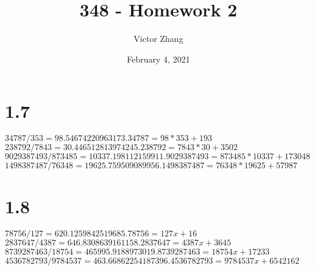 \documentclass{article}
\title{348 - Homework 2}
\author{Victor Zhang}
\date{February 4, 2021}
\begin{document}
\maketitle

\section*{1.7}
$34787/353 = 98.54674220963173. 34787 = 98*353 + 193$\\
$238792/7843 = 30.446512813974245. 238792 = 7843*30 + 3502$\\
$9029387493/873485 = 10337.198112159911. 9029387493 = 873485*10337 + 173048$\\
$1498387487/76348 = 19625.759509089956. 1498387487 = 76348*19625 + 57987$\\

\section*{1.8}
$78756/127 = 620.1259842519685. 78756 = 127x + 16$\\
$2837647/4387 = 646.8308639161158. 2837647 = 4387x + 3645$\\
$8739287463/18754 = 465995.9188973019. 8739287463 = 18754x + 17233$\\
$4536782793/9784537 = 463.66862254187396. 4536782793 = 9784537x + 6542162$\\
\end{document}
